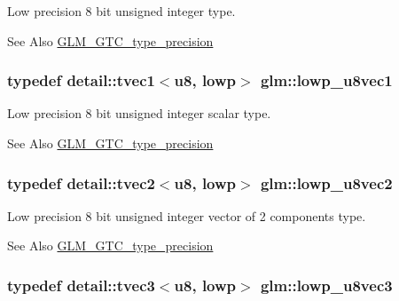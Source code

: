 Low precision 8 bit unsigned integer type. \begin{DoxySeeAlso}{See Also}
\hyperlink{group__gtc__type__precision}{G\-L\-M\-\_\-\-G\-T\-C\-\_\-type\-\_\-precision} 
\end{DoxySeeAlso}
\hypertarget{group__gtc__type__precision_gaee3cba2c93fa8cb7295671908995197c}{
\subsubsection[{lowp\-\_\-u8vec1}]{\setlength{\rightskip}{0pt plus 5cm}typedef detail\-::tvec1$<$u8, lowp$>$ {\bf glm\-::lowp\-\_\-u8vec1}}}\label{group__gtc__type__precision_gaee3cba2c93fa8cb7295671908995197c}
Low precision 8 bit unsigned integer scalar type. \begin{DoxySeeAlso}{See Also}
\hyperlink{group__gtc__type__precision}{G\-L\-M\-\_\-\-G\-T\-C\-\_\-type\-\_\-precision} 
\end{DoxySeeAlso}
\hypertarget{group__gtc__type__precision_ga8e5a056cbbcb70dca5c65950fa13a787}{
\subsubsection[{lowp\-\_\-u8vec2}]{\setlength{\rightskip}{0pt plus 5cm}typedef detail\-::tvec2$<$u8, lowp$>$ {\bf glm\-::lowp\-\_\-u8vec2}}}\label{group__gtc__type__precision_ga8e5a056cbbcb70dca5c65950fa13a787}
Low precision 8 bit unsigned integer vector of 2 components type. \begin{DoxySeeAlso}{See Also}
\hyperlink{group__gtc__type__precision}{G\-L\-M\-\_\-\-G\-T\-C\-\_\-type\-\_\-precision} 
\end{DoxySeeAlso}
\hypertarget{group__gtc__type__precision_gaf0d7154052c636edf4a902fc8a4a56f2}{
\subsubsection[{lowp\-\_\-u8vec3}]{\setlength{\rightskip}{0pt plus 5cm}typedef detail\-::tvec3$<$u8, lowp$>$ {\bf glm\-::lowp\-\_\-u8vec3}}}\label{group__gtc__type__precision_gaf0d7154052c636edf4a902fc8a4a56f2}
